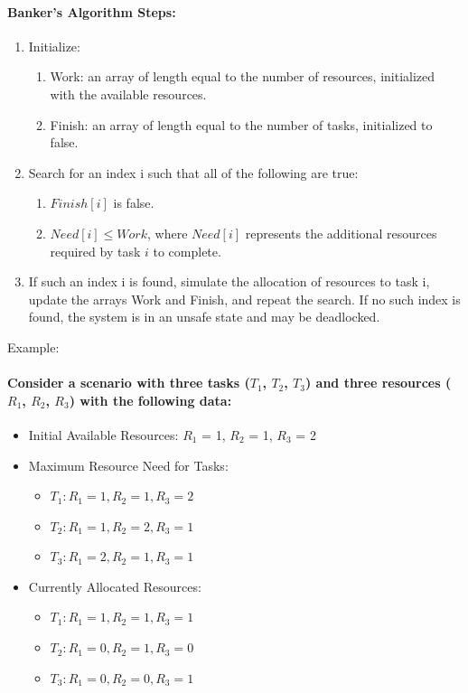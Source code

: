 \documentclass{article}
\begin{document}
\paragraph{Banker's Algorithm Steps:}
\begin{enumerate}
  \item Initialize:
  \begin{enumerate}
    \item Work: an array of length equal to the number of resources, initialized with the available resources.
    \item Finish: an array of length equal to the number of tasks, initialized to false.
  \end{enumerate}
  \item Search for an index i such that all of the following are true:
  \begin{enumerate}
    \item $Finish[i]$ is false.
    \item $Need[i] \leq Work$, where $Need[i]$ represents the additional resources required by task $i$ to complete.
  \end{enumerate}
  \item If such an index i is found, simulate the allocation of resources to task i, update the arrays Work and Finish, and repeat the search. If no such index is found, the system is in an unsafe state and may be deadlocked.
\end{enumerate}

Example:

\paragraph{Consider a scenario with three tasks ($T_1$, $T_2$, $T_3$) and three resources ($R_1$, $R_2$, $R_3$) with the following data:}

\begin{itemize}
  \item Initial Available Resources: $R_1$ = 1, $R_2$ = 1, $R_3$ = 2
  \item Maximum Resource Need for Tasks:
  \begin{itemize}
    \item $T_1: R_1 = 1, R_2 = 1, R_3 = 2$
    \item $T_2: R_1 = 1, R_2 = 2, R_3 = 1$
    \item $T_3: R_1 = 2, R_2 = 1, R_3 = 1$
  \end{itemize}
  \item Currently Allocated Resources:
  \begin{itemize}
    \item $T_1: R_1 = 1, R_2 = 1, R_3 = 1$
    \item $T_2: R_1 = 0, R_2 = 1, R_3 = 0$
    \item $T_3: R_1 = 0, R_2 = 0, R_3 = 1$
  \end{itemize}
\end{itemize}
\end{document}
